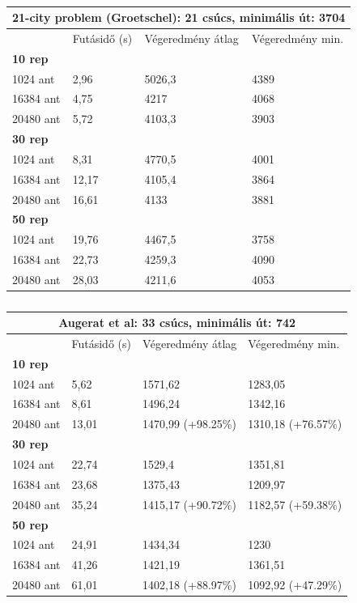 \begin{table}[ht!]
	\centering
	\begin{tabular}{|p{2cm}||p{3cm}|p{3.5cm}|p{3.5cm}|}
		\hline
		\multicolumn{4}{|c|}{21-city problem (Groetschel): 21 csúcs, minimális út: 3704} \\
		\hline
		& Futásidő (s) & Végeredmény átlag & Végeredmény min.\\
		\hline
		\textbf{10 rep} & & & \\
		1024 ant & 2,96 & 5026,3 & 4389 \\
		16384 ant & 4,75 & 4217 & 4068 \\
		20480 ant & 5,72 & 4103,3 & 3903 \\
		\hline
		\textbf{30 rep} & & & \\
		1024 ant & 8,31 & 4770,5 & 4001 \\
		16384 ant & 12,17 & 4105,4 & 3864 \\
		20480 ant & 16,61 & 4133 & 3881\\
		\hline
		\textbf{50 rep} & & & \\
		1024 ant & 19,76 & 4467,5 & 3758 \\
		16384 ant & 22,73 & 4259,3 & 4090 \\
		20480 ant & 28,03 & 4211,6 & 4053 \\
		\hline
	\end{tabular}
	\caption{}
	\label{table:CVRP_gr21}
\end{table}

\begin{table}[ht!]
	\centering
	\begin{tabular}{|p{2cm}||p{3cm}|p{3.5cm}|p{3.5cm}|}
		\hline
		\multicolumn{4}{|c|}{Augerat et al: 33 csúcs, minimális út: 742} \\
		\hline
		& Futásidő (s) & Végeredmény átlag & Végeredmény min.\\
		\hline
		\textbf{10 rep} & & &\\
		1024 ant & 5,62 & 1571,62 & 1283,05 \\
		16384 ant & 8,61 & 1496,24 & 1342,16 \\
		20480 ant & 13,01 & 1470,99 (+98.25\%) & 1310,18 (+76.57\%) \\
		\hline
		\textbf{30 rep} & & & \\
		1024 ant & 22,74 & 1529,4 & 1351,81 \\
		16384 ant & 23,68 & 1375,43 & 1209,97 \\
		20480 ant & 35,24 & 1415,17 (+90.72\%) & 1182,57 (+59.38\%) \\
		\hline
		\textbf{50 rep} & & & \\
		1024 ant & 24,91 & 1434,34 & 1230\\
		16384 ant & 41,26 & 1421,19 & 1361,51 \\
		20480 ant & 61,01 & 1402,18 (+88.97\%) & 1092,92 (+47.29\%) \\
		\hline
	\end{tabular}
	\caption{}
	\label{table:CVRP_a33}
\end{table}

